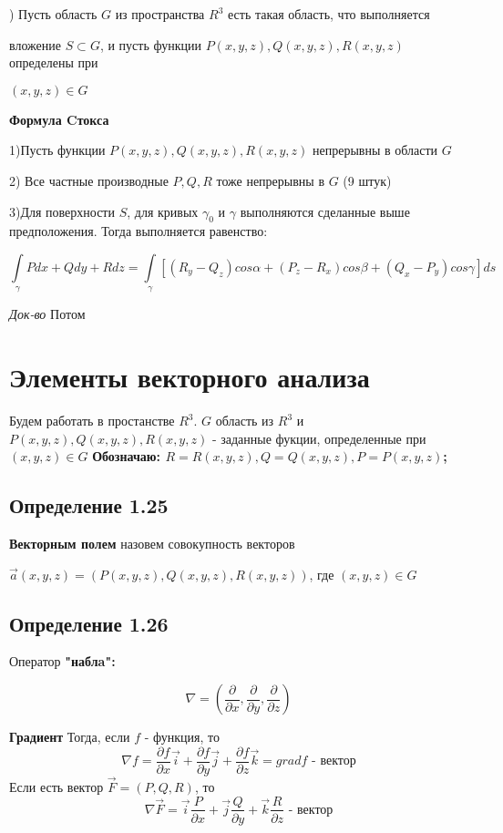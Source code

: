 \documentclass[12pt]{article}
\begin{document}
) Пусть область $G$ из пространства $R^3$ есть такая область, что
выполняется\par  вложение $S \subset G$, и пусть функции $P(x, y, z), Q(x, y, z),
R(x, y, z)$ определены при \par $(x, y, z) \in G$

\textbf{Формула Cтокса}

1)Пусть функции $P(x, y, z), Q(x, y, z), R(x, y, z)$ непрерывны в области $G$ 

2) Все частные производные $P , Q , R$ тоже непрерывны в $G$ (9 штук)

3)Для поверхности $S$, для кривых $\gamma_0$ и $\gamma$ выполняются сделанные выше
предположения. Тогда выполняется равенство: 

\begin{equation}\label{eq11}
\int\limits_{\gamma} Pdx + Qdy + Rdz
=
\int\limits_{\gamma} [(R_y - Q_z)cos\alpha + (P_z - R_x)cos\beta	+ (Q_x - P_y)cos\gamma]ds
\end{equation}

\textit{Док-во}
Потом



\newpage
\section{Элементы векторного анализа}
	Будем работать в простанстве $R^3$. $G$ область из $R^3$ и $P(x,y,z), Q(x,y,z), R(x,y,z)$ - заданные фукции, определенные при 
	$(x,y,z) \in G$
	\textbf{Обозначаю: $R = R(x, y ,z) , Q = Q(x,y,z) , P = P(x,y,z)$;}
	
\subsection*{Определение 1.25}
	\textbf{Векторным полем} назовем совокупность векторов 
	
	$\vec{a}(x,y,z) = (P(x,y,z) , Q(x,y,z), R(x,y,z))$, где $(x,y,z) \in G$
	
\subsection*{Определение 1.26}
Оператор \textbf{"наблa":}
	
	

	$$\nabla = ( \frac{\partial}{\partial x} ,  \frac{\partial}{\partial y} , \frac{\partial}{\partial z})$$
	
\textbf{Градиент}
	Тогда, если $f$ - функция, то  
	$$\nabla f =   \frac{\partial f}{\partial x} \vec{i} +  \frac{\partial f}{\partial y}\vec{j} + \frac{\partial f}{\partial z} \vec{k}= grad f \text{ - вектор}$$ 
 	Если есть вектор $\vec{F} = (P, Q, R)$, то
 		$$\nabla \vec{F} = \vec{i}  \frac{P}{\partial x} + \vec{j} \frac{Q}{\partial y} + \vec{k}\frac{R}{\partial z} \text{ - вектор}$$ 
	
\end{document}
